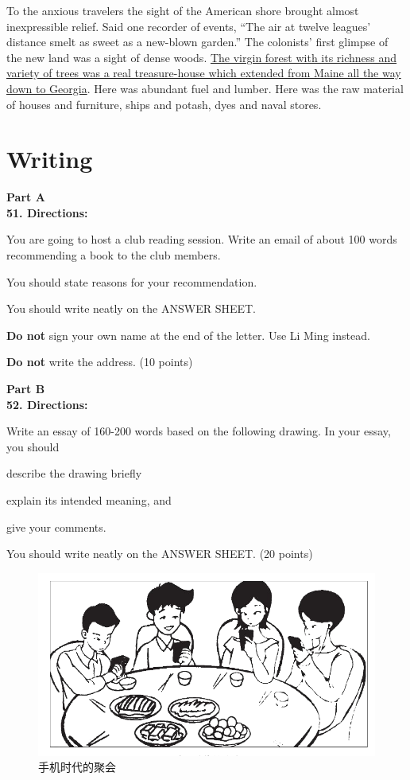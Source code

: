 To the anxious travelers the sight of the American shore brought almost
inexpressible relief. Said one recorder of events, ``The air at twelve
leagues' distance smelt as sweet as a new-blown garden.'' The colonists'
first glimpse of the new land was a sight of dense woods.
\transnum \uline{The virgin forest with its richness and variety of trees
	was a real treasure-house which extended from Maine all the way down to
	Georgia}. Here was abundant fuel and lumber. Here was the raw material
of houses and furniture, ships and potash, dyes and naval stores.



\newpage

\section{Writing}


\noindent
\textbf{Part A}\\
\textbf{51. Directions:}

You are going to host a club reading session. Write an email of about
100 words recommending a book to the club members.

You should state reasons for your recommendation.

You should write neatly on the ANSWER SHEET.

\textbf{Do not} sign your own name at the end of the letter. Use Li Ming
instead.

\textbf{Do not} write the address. (10 points)


\vspace{2em}

\noindent
\textbf{Part B}\\
\textbf{52. Directions:}

Write an essay of 160-200 words based on the following drawing. In your
essay, you should
\begin{listwrite}
	\item
 describe the drawing briefly
\item 
 explain its intended meaning, and
\item 
 give your comments.
	
\end{listwrite}

You should write neatly on the ANSWER SHEET. (20 points)

\begin{figure}[h!]
	\centering
	\includegraphics[width=0.58\linewidth]{picture/2015.png}
	\caption*{手机时代的聚会}
\end{figure}

